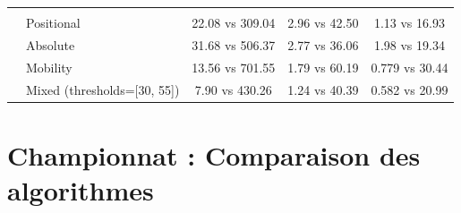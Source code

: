 \begin{table}[H]
{\begin{tabular}{
            @{}
            >{\raggedright\arraybackslash}p{1cm}
            >{\raggedright\arraybackslash}p{4cm}
            S
            S
            S
            @{}
            }
            \midrule
                                                                                                   \\
            \cmidrule(lr){1-5}
                           & Positional                  & {22.08 vs 309.04}      & {2.96 vs 42.50}          & {1.13 vs 16.93}         \\
                           & Absolute                    & {31.68 vs 506.37}      & {2.77 vs 36.06}          & {1.98 vs 19.34}         \\
                           & Mobility                    & {13.56 vs 701.55}      & {1.79 vs 60.19}          & {0.779 vs 30.44}        \\
                           & Mixed (thresholds=[30, 55]) & {7.90 vs 430.26}       & {1.24 vs 40.39}          & {0.582 vs 20.99}        \\
            \bottomrule
        \end{tabular}
    }
    \label{tab:node_explored_summary-2}
\end{table}



\section{Championnat : Comparaison des algorithmes}
\label{sec:championship}

